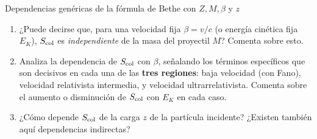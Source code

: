 \begin{Ejercicio}{Dependencias genéricas de la fórmula de Bethe con $Z, M, \beta$ y $z$}
\begin{enumerate}[label=\alph*)]
\item ¿Puede decirse que, para una velocidad fija $\beta = v/c$ (o energía cinética fija $E_K$), 
$S_\text{\text{col}}$ es \emph{independiente} de la masa del proyectil $M$?  
Comenta sobre esto.

\item Analiza la dependencia de $S_\text{\text{col}}$ con $\beta$, señalando los términos específicos que 
son decisivos en cada una de las \textbf{tres regiones}:  
baja velocidad (con Fano), velocidad relativista intermedia, y velocidad ultrarrelativista.  
Comenta sobre el aumento o disminución de $S_\text{\text{col}}$ con $E_K$ en cada caso.

\item ¿Cómo depende $S_\text{\text{col}}$ de la carga $z$ de la partícula incidente?  
¿Existen también aquí dependencias indirectas?

\end{enumerate}
\end{Ejercicio}

